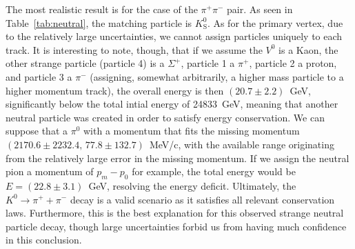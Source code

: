 \documentclass[twocolumn]{article}
\begin{document}
The most realistic result is for the case of the $\pi^+ \pi^-$ pair. As seen in Table~\ref{tab:neutral}, the matching particle is $K^0_{\text{S}}$. As for the primary vertex, due to the relatively large uncertainties, we cannot assign particles uniquely to each track. It is interesting to note, though, that if we assume the $V^0$ is a Kaon, the other strange particle (particle 4) is a $\Sigma^+$, particle 1 a $\pi^+$, particle 2 a proton, and particle 3 a $\pi^-$ (assigning, somewhat arbitrarily, a higher mass particle to a higher momentum track), the overall energy is then $(20.7 \pm 2.2)$~GeV, significantly below the total intial energy of 24833~GeV, meaning that another neutral particle was created in order to satisfy energy conservation. We can suppose that a $\pi^0$ with a momentum that fits the missing momentum $ (2170.6 \pm 2232.4,\, 77.8 \pm 132.7)$~MeV/c, with the available range originating from the relatively large error in the missing momentum. If we assign the neutral pion a momentum of $p_m - p_0$ for example, the total energy would be $E = (22.8 \pm 3.1)$~GeV, resolving the energy deficit. Ultimately, the $K^0 \to \pi^+ + \pi^-$ decay is a valid scenario as it satisfies all relevant conservation laws. Furthermore, this is the best explanation for this observed strange neutral particle decay, though large uncertainties forbid us from having much confidence in this conclusion.
\end{document}
